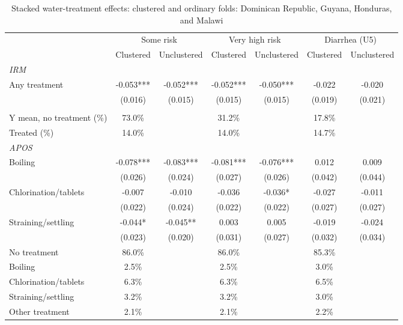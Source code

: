 \begin{table}[htbp]
\centering
\caption{Stacked water-treatment effects: clustered and ordinary folds: Dominican Republic, Guyana, Honduras, and Malawi}
\label{tab:water-treatment-appendix-selected-countries}
\scriptsize
\setlength{\tabcolsep}{4pt}
\renewcommand{\arraystretch}{0.92}
\begin{adjustbox}{max width=\linewidth}
\begin{tabular}{lcccccc}
\hline\hline
 & \multicolumn{2}{c}{Some risk} & \multicolumn{2}{c}{Very high risk} & \multicolumn{2}{c}{Diarrhea (U5)} \\
 & Clustered & Unclustered & Clustered & Unclustered & Clustered & Unclustered \\
\hline
\multicolumn{7}{l}{\textit{IRM}} \\
Any treatment & -0.053*** & -0.052*** & -0.052*** & -0.050*** & -0.022 & -0.020 \\
 & (0.016) & (0.015) & (0.015) & (0.015) & (0.019) & (0.021) \\
\addlinespace[6pt]
\multicolumn{7}{l}{\textit{Descriptive statistics}} \\
Y mean, no treatment (\%) & 73.0\% &  & 31.2\% &  & 17.8\% &  \\
Treated (\%) & 14.0\% &  & 14.0\% &  & 14.7\% &  \\
\midrule
\multicolumn{7}{l}{\textit{APOS}} \\
Boiling & -0.078*** & -0.083*** & -0.081*** & -0.076*** & 0.012 & 0.009 \\
 & (0.026) & (0.024) & (0.027) & (0.026) & (0.042) & (0.044) \\
Chlorination/tablets & -0.007 & -0.010 & -0.036 & -0.036* & -0.027 & -0.011 \\
 & (0.022) & (0.024) & (0.022) & (0.022) & (0.027) & (0.027) \\
Straining/settling & -0.044* & -0.045** & 0.003 & 0.005 & -0.019 & -0.024 \\
 & (0.023) & (0.020) & (0.031) & (0.027) & (0.032) & (0.034) \\
\addlinespace[6pt]
No treatment & 86.0\% &  & 86.0\% &  & 85.3\% &  \\
Boiling & 2.5\% &  & 2.5\% &  & 3.0\% &  \\
Chlorination/tablets & 6.3\% &  & 6.3\% &  & 6.5\% &  \\
Straining/settling & 3.2\% &  & 3.2\% &  & 3.0\% &  \\
Other treatment & 2.1\% &  & 2.1\% &  & 2.2\% &  \\

\end{tabular}
\end{adjustbox}
\end{table}

